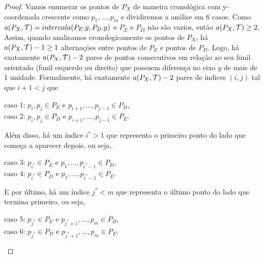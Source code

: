 \begin{proof}
    Vamos enumerar os pontos de $P_X$ de maneira cronológica com y-coordenada crescente como $p_1,\ldots,p_m$ e dividiremos a análise em 6 casos.
    Como $a(P_X,\mathcal{T}) = intercala(P_E.y,P_D.y)$ e $P_E$ e $P_D$ não são vazios, então $a(P_X,\mathcal{T}) \geq 2$. Assim, quando analisamos cronologicamente os pontos de $P_X$, há $a(P_X,\mathcal{T}) - 1 \geq 1$ alternações entre pontos de $P_E$ e pontos de $P_D$. Logo, há exatamente $a(P_X,\mathcal{T}) - 2$ pares de pontos consecutivos em relação ao seu funil orientado (funil esquerdo ou direito) que possuem diferença no eixo $y$ de mais de 1 unidade. Formalmente, há exatamente $a(P_X,\mathcal{T}) - 2$ pares de índices $(i,j)$ tal que $i + 1 < j$ que 
    \begin{center}
        caso 1: $p_i,p_j \in P_E$ e $p_{i+1},\ldots,p_{j-1} \in P_D$,\\
        caso 2: $p_i,p_j \in P_D$ e $p_{i+1},\ldots,p_{j-1} \in P_E$.
    \end{center}

    Além disso, há um índice $i^{*} > 1$ que representa o primeiro ponto do lado que começa a aparecer depois, ou seja,
    \begin{center}
        caso 3: $p_{i^{*}} \in P_E$ e $p_1,\ldots,p_{i^{*}-1} \in P_D$,\\
        caso 4: $p_{i^{*}}  \in P_D$ e $p_1,\ldots,p_{i^{*}-1} \in P_E$.
    \end{center}

    E por último, há um índice $j^{*} < m$ que representa o último ponto do lado que termina primeiro, ou seja,
    \begin{center}
        caso 5: $p_{j^{*}} \in P_E$ e $p_{j^{*} + 1},\ldots,p_m \in P_D$,\\
        caso 6: $p_{j^{*}}  \in P_D$ e $p_{j^{*} + 1},\ldots,p_m \in P_E$.
    \end{center} 

    \begin{figure}
\end{figure}
\end{proof}
